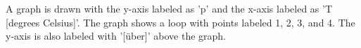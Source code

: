 A graph is drawn with the y-axis labeled as 'p' and the x-axis labeled as 'T [degrees Celsius]'. The graph shows a loop with points labeled 1, 2, 3, and 4. The y-axis is also labeled with '[über]' above the graph.